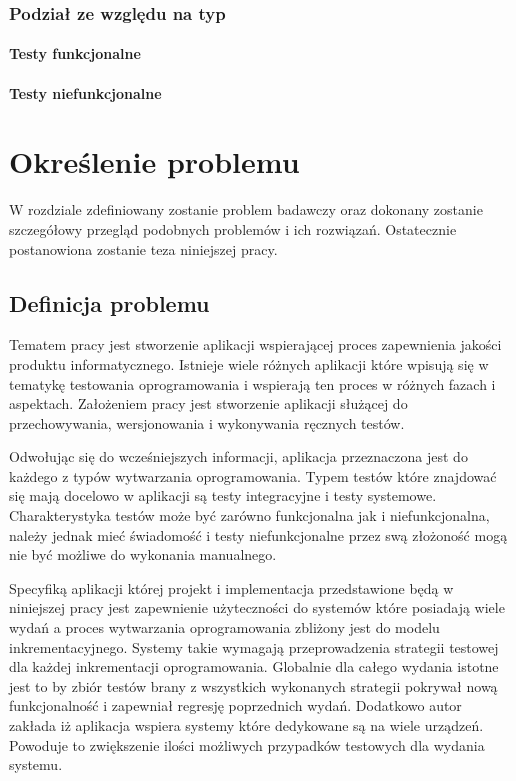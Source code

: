 \subsection{Podział ze względu na typ}
\subsubsection{Testy funkcjonalne}
\subsubsection{Testy niefunkcjonalne}
\chapter{Określenie problemu} %
\label{cha:okreslenie_problemu}

W rozdziale zdefiniowany zostanie problem badawczy oraz dokonany zostanie szczegółowy przegląd  podobnych problemów i ich rozwiązań. Ostatecznie postanowiona zostanie teza niniejszej pracy.

\section{Definicja problemu} %
\label{sec:definicja_problemu}

Tematem pracy jest stworzenie aplikacji wspierającej proces zapewnienia jakości produktu informatycznego. Istnieje wiele różnych aplikacji które wpisują się w tematykę testowania oprogramowania i wspierają ten proces w różnych fazach i aspektach. Założeniem pracy jest stworzenie aplikacji służącej do przechowywania, wersjonowania i wykonywania ręcznych testów.

Odwołując się do wcześniejszych informacji, aplikacja przeznaczona jest do każdego z typów wytwarzania oprogramowania. Typem testów które znajdować się mają docelowo w aplikacji są testy integracyjne i testy systemowe. Charakterystyka testów może być zarówno funkcjonalna jak i niefunkcjonalna, należy jednak mieć świadomość i testy niefunkcjonalne przez swą złożoność mogą nie być możliwe do wykonania manualnego.

Specyfiką aplikacji której projekt i implementacja przedstawione będą w niniejszej pracy jest zapewnienie użyteczności do systemów które posiadają wiele wydań a proces wytwarzania oprogramowania zbliżony jest do modelu inkrementacyjnego. Systemy takie wymagają przeprowadzenia strategii testowej dla każdej inkrementacji oprogramowania. Globalnie dla całego wydania istotne jest to by zbiór testów brany z wszystkich wykonanych strategii pokrywał nową funkcjonalność i zapewniał regresję poprzednich wydań. Dodatkowo autor zakłada iż aplikacja wspiera systemy które dedykowane są na wiele urządzeń. Powoduje to zwiększenie ilości możliwych przypadków testowych dla wydania systemu. 

